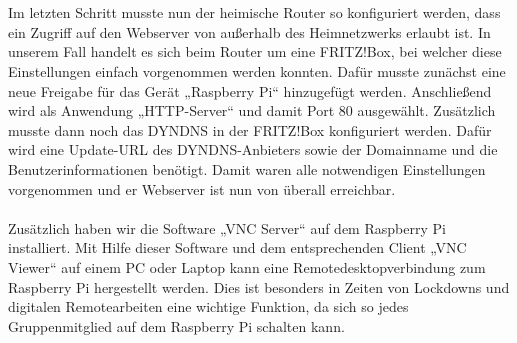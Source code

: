 \\
\\
Im letzten Schritt musste nun der heimische Router so konfiguriert werden, dass ein Zugriff auf den Webserver von außerhalb des Heimnetzwerks erlaubt ist. In unserem Fall handelt es sich beim Router um eine FRITZ!Box, bei welcher diese Einstellungen einfach vorgenommen werden konnten.  Dafür musste zunächst eine neue Freigabe für das Gerät „Raspberry Pi“ hinzugefügt werden. Anschließend wird als Anwendung „HTTP-Server“ und damit Port 80 ausgewählt. Zusätzlich musste dann noch das DYNDNS in der FRITZ!Box konfiguriert werden. Dafür wird eine Update-URL des DYNDNS-Anbieters sowie der Domainname und die Benutzerinformationen benötigt. Damit waren alle notwendigen Einstellungen vorgenommen und er Webserver ist nun von überall erreichbar.
\\
\\
Zusätzlich haben wir die Software „VNC Server“ auf dem Raspberry Pi installiert. Mit Hilfe dieser Software und dem entsprechenden Client „VNC Viewer“ auf einem PC oder Laptop kann eine Remotedesktopverbindung zum Raspberry Pi hergestellt werden. Dies ist besonders  in Zeiten von Lockdowns und  digitalen Remotearbeiten eine wichtige Funktion, da sich so jedes Gruppenmitglied auf dem Raspberry Pi schalten kann.

